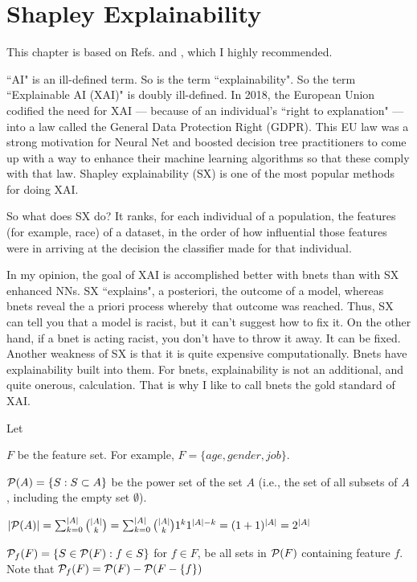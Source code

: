 \chapter{Shapley Explainability}

This chapter
is based on 
Refs.\cite{maz-shap-titanic}
and \cite{maz-shap-income},
which I highly recommended.


\label{ch-shapley}
``AI" is an ill-defined term. 
So is the term ``explainability". 
So the term ``Explainable 
AI (XAI)" is doubly ill-defined.
In 2018, the European Union codified 
the need for XAI ---
because of an individual’s ``right to
 explanation" ---
into a law called the General Data Protection 
Right (GDPR). This EU law was a strong 
motivation for Neural Net  
and boosted decision tree practitioners 
to come up with a way to enhance  
their machine learning algorithms
so that these comply with that law. Shapley 
explainability (SX) is 
one of the most popular 
methods for doing XAI.

So what does SX do? It ranks, for each individual 
of a population, the features (for example, race)
of a dataset, in the order of how influential those
features were in arriving at the decision the 
classifier made for that individual.

In my opinion, the goal of XAI is 
accomplished better with
bnets
 than with SX enhanced NNs.
SX ``explains", a posteriori, the outcome of a model, 
whereas bnets reveal the a priori process whereby 
that outcome was reached. Thus, SX can tell you 
that a model is racist, but it can't suggest 
how to fix it. On the other hand, if a bnet 
is acting racist, you don't have to throw it away. 
It can be fixed. 
Another
weakness of SX is that
it is quite expensive
computationally.
Bnets have explainability
built into them.
For bnets, explainability is
not an additional, and quite
onerous, calculation.
That is why I like to call 
bnets the gold standard of XAI.

Let

$F$ be the feature set. For example,
$F=\{age, gender, job\}$. 

${\cal P}(A)=
\{S: S\subset A \}$ be the power 
set of the set $A$ (i.e., the
set of all subsets of $A$, including
the empty set $\emptyset$).

$|{\cal P}(A)|=\sum_{k=0}^{|A|} {|A|\choose k} =
\sum_{k=0}^{|A|} {|A|\choose k}1^k 1^{|A|-k}
= (1+1)^{|A|}=2^{|A|}$


${\cal P}_f(F)=\{S\in {\cal P}(F): f\in S\}$
for $f\in F$, be all sets in ${\cal P}(F)$
containing feature $f$. Note that 
 ${\cal P}_f(F)= {\cal P}(F)-{\cal P}(F-\{f\})$

